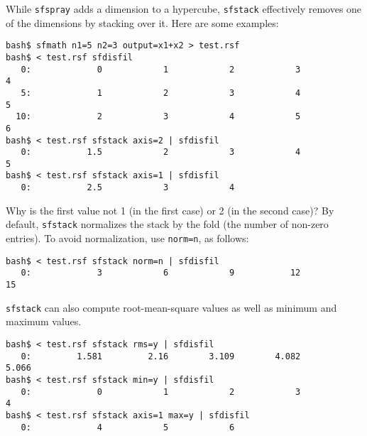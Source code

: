 \noindent\doublebox{\parbox{\textwidth}{
    
  }}

While \texttt{sfspray} adds a dimension to a hypercube,
\texttt{sfstack} effectively removes one of the dimensions by stacking
over it. Here are some examples:
\begin{verbatim}
bash$ sfmath n1=5 n2=3 output=x1+x2 > test.rsf
bash$ < test.rsf sfdisfil
   0:             0            1            2            3            4
   5:             1            2            3            4            5
  10:             2            3            4            5            6
bash$ < test.rsf sfstack axis=2 | sfdisfil
   0:           1.5            2            3            4            5
bash$ < test.rsf sfstack axis=1 | sfdisfil
   0:           2.5            3            4
\end{verbatim}
Why is the first value not 1 (in the first case) or 2 (in the second
case)? By default, \texttt{sfstack} normalizes the stack by the fold
(the number of non-zero entries). To avoid normalization, use
\texttt{norm=n}, as follows:
\begin{verbatim}
bash$ < test.rsf sfstack norm=n | sfdisfil 
   0:             3            6            9           12           15
\end{verbatim}
\texttt{sfstack} can also compute root-mean-square values as 
well as minimum and maximum values.
\begin{verbatim}
bash$ < test.rsf sfstack rms=y | sfdisfil
   0:         1.581         2.16        3.109        4.082        5.066
bash$ < test.rsf sfstack min=y | sfdisfil
   0:             0            1            2            3            4
bash$ < test.rsf sfstack axis=1 max=y | sfdisfil 
   0:             4            5            6
\end{verbatim}

\noindent\doublebox{\parbox{\textwidth}{
    
  }}

